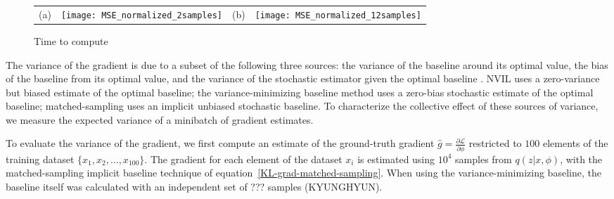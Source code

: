 \documentclass{article} %
\begin{document}
\begin{figure}[tbh]
  \begin{center}
    \begin{tabular}{p{0.0in}p{2.25in}p{0.0in}p{2.25in}}
      \parbox[b]{0in}{(a) \vspace{3.5cm}} & \texttt{[image: MSE\_normalized\_2samples]} & 
      \parbox[b]{0in}{(b) \vspace{3.5cm}} & \texttt{[image: MSE\_normalized\_12samples]}  %
    \end{tabular}
  \end{center}
  \caption{Time to compute  \label{time_all_samples}} 
\end{figure}


The variance of the gradient is due to a subset of the following three sources: the variance of the baseline around its optimal value, the bias of the baseline from its optimal value, and the variance of the stochastic estimator given the optimal baseline \cite{greensmith2004variance}.  NVIL uses a zero-variance but biased estimate of the optimal baseline; the variance-minimizing baseline method uses a zero-bias stochastic estimate of the optimal baseline; matched-sampling uses an implicit unbiased stochastic baseline.  To characterize the collective effect of these sources of variance, %
we measure the expected variance of a minibatch of gradient estimates.


To evaluate the variance of the gradient, we first compute an estimate of the ground-truth gradient $\hat{g} = \frac{\partial \mathcal{L}}{\partial \phi}$ restricted to $100$ elements of the training dataset $\{x_1, x_2, ..., x_{100}\}$. The gradient for each element of the dataset $x_i$ is estimated using $10^4$ samples from $q(z|x, \phi)$, with %
the matched-sampling implicit baseline technique of equation~\ref{KL-grad-matched-sampling}.  When using the variance-minimizing baseline, the baseline itself was calculated with an independent set of ??? samples (KYUNGHYUN).
\end{document}
